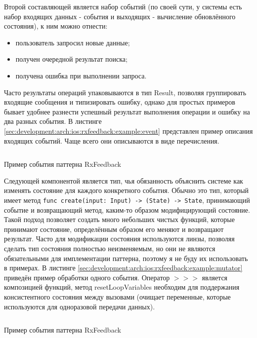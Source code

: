 Второй составляющей является набор событий (по своей сути, у системы есть набор входящих данных - события и выходящих - вычисление обновлённого состояния), к ним можно отнести:

\begin{itemize}
  \item пользователь запросил новые данные;
  \item получен очередной результат поиска;
  \item получена ошибка при выполнении запроса.
\end{itemize}

Часто результаты операций упаковываются в тип Result, позволяя группировать входящие сообщения и типизировать ошибку, однако для простых примеров бывает удобнее разнести успешный результат выполнения операции и ошибку на два разных события. В листинге \ref{sec:development:arch:ios:rxfeedback:example:event} представлен пример описания входящих событий. Чаще всего они описываются в виде перечисления.

\begin{code}
  \inputminted{swift}{inc/src/rx-feedback-event.swift}
   \caption{Пример события паттерна RxFeedback}
   \label{sec:development:arch:ios:rxfeedback:example:event}
\end{code}

Следующей компонентой является тип, чья обязанность объяснить системе как изменять состояние для каждого конкретного события. Обычно это тип, который имеет метод \texttt{func create(input: Input) -> (State) -> State}, принимающий событие и возвращающий метод, каким-то образом модифицирующий состояние. Такой подход позволяет создать много небольших чистых функций, которые принимают состояние, определённым образом его меняют и возвращают результат. Часто для модификации состояния используются линзы, позволяя сделать тип состояния полностью неизменяемым, но они не являются обязательными для имплементации паттерна, поэтому я не буду их использовать в примерах. В листинге \ref{sec:development:arch:ios:rxfeedback:example:mutator} приведён пример обработки одного события. Оператор \(>>>\) является композицией функций, метод resetLoopVariables необходим для поддержания консистентного состояния между вызовами (очищает переменные, которые используются для одноразовой передачи данных).

\begin{code}
  \inputminted{swift}{inc/src/rx-feedback-state-mutator.swift}
   \caption{Пример события паттерна RxFeedback}
   \label{sec:development:arch:ios:rxfeedback:example:mutator}
\end{code}


